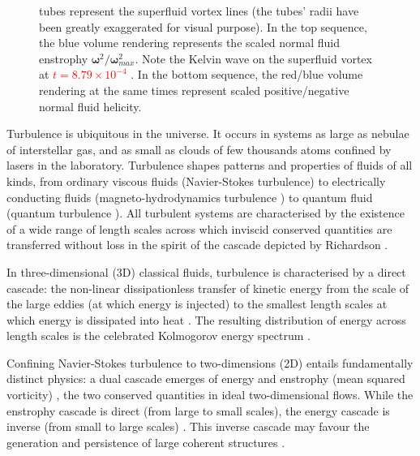 \documentclass[%
 reprint,
 amsmath,amssymb,
 aps,
 prl,
]{revtex4-2}
\newcommand{\bom}{\boldsymbol{\omega}}
\def\red#1{\textcolor{red}{#1}}
\def\magenta#1{\textcolor{magenta}{#1}}
\begin{document}
\begin{figure}
{tubes represent the superfluid vortex lines (the tubes’ radii have been 
greatly exaggerated for visual purpose). In the top sequence,
the blue volume rendering represents the scaled normal fluid enstrophy 
$\bom^2/\bom^2_{max}$. Note the Kelvin wave on the superfluid
vortex at \red{$t=8.79\times10^{-4}$} . In the bottom sequence, the red/blue volume
rendering at the same times represent scaled positive/negative normal fluid
helicity.	
}
    \label{fig:visualisation}
\end{figure}

Turbulence is ubiquitous in the universe.  It occurs in systems
as large as nebulae of interstellar gas, and as small as clouds of
few thousands atoms confined by lasers in the laboratory.
Turbulence shapes patterns and properties of fluids of all
kinds, from ordinary
 viscous fluids (Navier-Stokes turbulence\cite{frisch1995}) 
to electrically conducting fluids (magneto-hydrodynamics turbulence
\cite{canuto-dalsgaard-1998}) to quantum fluid
(quantum turbulence \cite{barenghi-etal-2023,
Barenghi_Skrbek_Sreenivasan_2023}).
All turbulent systems are characterised by 
the existence of a wide range 
of length scales across which inviscid conserved quantities 
are transferred without loss in the spirit of the cascade 
depicted by Richardson \cite{richardson1922weather}. 

In three-dimensional (3D) classical fluids, turbulence 
is characterised by a direct cascade: the
non-linear dissipationless transfer of kinetic energy from the scale of
the large eddies (at which energy is injected) to the smallest length scales
at which energy is dissipated into heat
\cite{richardson1922weather,kolmogorov-1941}. 
The resulting distribution of energy across length scales is
the celebrated Kolmogorov energy spectrum 
\cite{kolmogorov-1941,frisch1995}. 

Confining Navier-Stokes turbulence to two-dimensions (2D) entails 
fundamentally distinct physics: a dual cascade emerges of energy and enstrophy 
(mean squared vorticity) \cite{kraichnan-1967,boffetta-ecke-2012}, 
the two conserved quantities in ideal two-dimensional flows.
While the enstrophy cascade is direct (from large to small
scales), the energy cascade is inverse (from small to large scales)
\cite{boffetta-musacchio-2010}. This inverse cascade 
may favour the generation and persistence of large coherent 
structures \cite{laurie-etal-2014}. 
\end{document}
